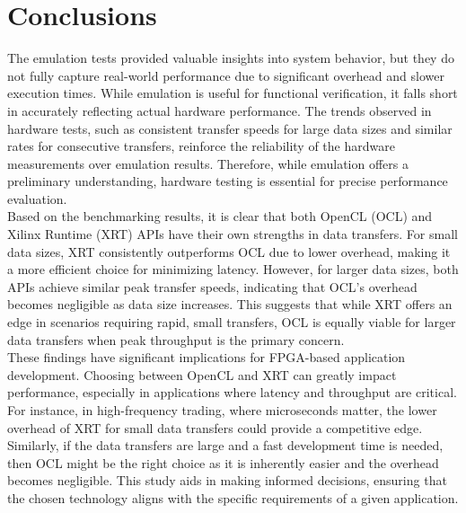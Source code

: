 \section{Conclusions}

The emulation tests provided valuable insights into system behavior, but they do not fully capture real-world performance due to significant overhead and slower execution times. While emulation is useful for functional verification, it falls short in accurately reflecting actual hardware performance. The trends observed in hardware tests, such as consistent transfer speeds for large data sizes and similar rates for consecutive transfers, reinforce the reliability of the hardware measurements over emulation results. Therefore, while emulation offers a preliminary understanding, hardware testing is essential for precise performance evaluation. \\

Based on the benchmarking results, it is clear that both OpenCL (OCL) and Xilinx Runtime (XRT) APIs have their own strengths in data transfers. For small data sizes, XRT consistently outperforms OCL due to lower overhead, making it a more efficient choice for minimizing latency. However, for larger data sizes, both APIs achieve similar peak transfer speeds, indicating that OCL's overhead becomes negligible as data size increases. This suggests that while XRT offers an edge in scenarios requiring rapid, small transfers, OCL is equally viable for larger data transfers when peak throughput is the primary concern. \\

These findings have significant implications for FPGA-based application development. Choosing between OpenCL and XRT can greatly impact performance, especially in applications where latency and throughput are critical. For instance, in high-frequency trading, where microseconds matter, the lower overhead of XRT for small data transfers could provide a competitive edge. Similarly, if the data transfers are large and a fast development time is needed, then OCL might be the right choice as it is inherently easier and the overhead becomes negligible. This study aids in making informed decisions, ensuring that the chosen technology aligns with the specific requirements of a given application.